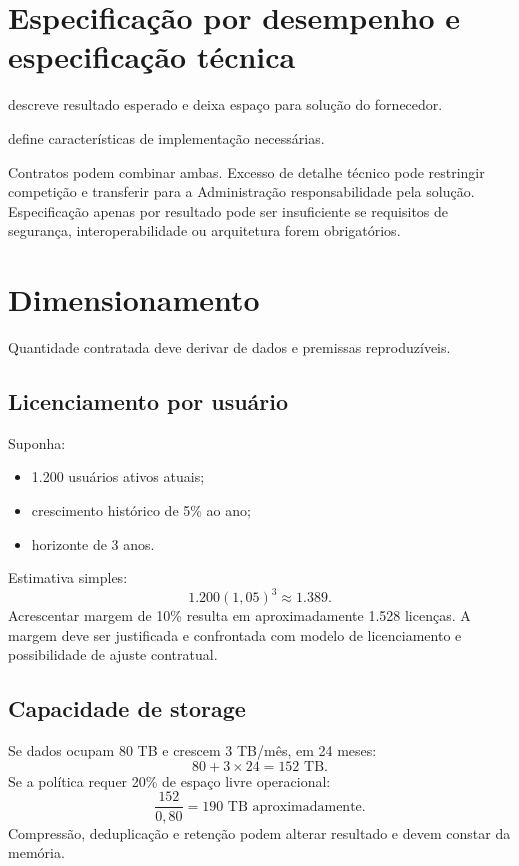 \section{Especificação por desempenho e especificação técnica}

 descreve resultado esperado e deixa espaço para solução do fornecedor.

 define características de implementação necessárias.

Contratos podem combinar ambas. Excesso de detalhe técnico pode restringir competição e transferir para a Administração responsabilidade pela solução. Especificação apenas por resultado pode ser insuficiente se requisitos de segurança, interoperabilidade ou arquitetura forem obrigatórios.

\section{Dimensionamento}

Quantidade contratada deve derivar de dados e premissas reproduzíveis.

\subsection{Licenciamento por usuário}

Suponha:
\begin{itemize}
\item 1.200 usuários ativos atuais;
\item crescimento histórico de 5\% ao ano;
\item horizonte de 3 anos.
\end{itemize}

Estimativa simples:
\[
1.200(1{,}05)^3\approx1.389.
\]
Acrescentar margem de 10\% resulta em aproximadamente 1.528 licenças. A margem deve ser justificada e confrontada com modelo de licenciamento e possibilidade de ajuste contratual.

\subsection{Capacidade de storage}

Se dados ocupam 80 TB e crescem 3 TB/mês, em 24 meses:
\[
80+3\times24=152\text{ TB}.
\]
Se a política requer 20\% de espaço livre operacional:
\[
\frac{152}{0{,}80}=190\text{ TB aproximadamente}.
\]
Compressão, deduplicação e retenção podem alterar resultado e devem constar da memória.

